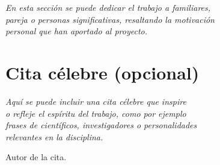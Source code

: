 \begin{flushright}
	\small\em{
		En esta sección se puede dedicar el trabajo a familiares, \\
        pareja o personas significativas, resaltando la motivación \\
        personal que han aportado al proyecto.
	}
\end{flushright}

\cleardoublepage %


\chapter*{Cita célebre (opcional)}
\thispagestyle{empty}

\begin{flushright}
	\small\em{
		Aquí se puede incluir una cita célebre que inspire \\
        o refleje el espíritu del trabajo, como por ejemplo \\
        frases de científicos, investigadores o personalidades\\
        relevantes en la disciplina.
	}
	
	\vspace{0.5cm}
	
	\small{
		Autor de la cita.
	}
\end{flushright}

\cleardoublepage
